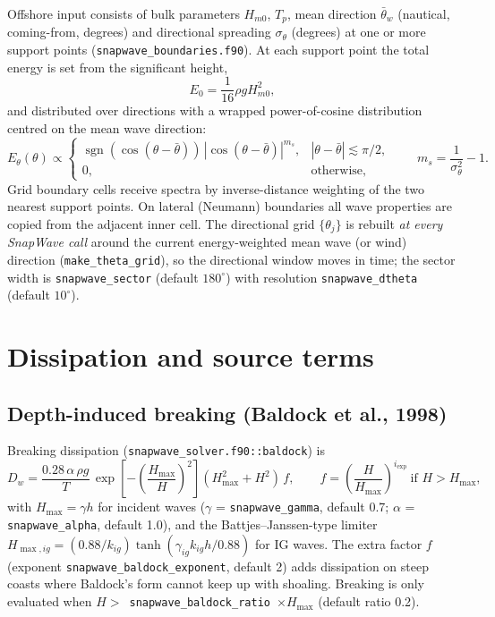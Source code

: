 \documentclass[11pt,a4paper]{article}
\newcommand{\ee}{E_\theta}
\newcommand{\code}[1]{\texttt{#1}}
\begin{document}
Offshore input consists of bulk parameters $H_{m0}$, $T_p$, mean direction
$\bar\theta_w$ (nautical, coming-from, degrees) and directional spreading
$\sigma_\theta$ (degrees) at one or more support points
(\code{snapwave\_boundaries.f90}). At each support point the total energy is set
from the significant height,
\begin{equation}
E_0=\frac{1}{16}\rho g H_{m0}^{2},
\end{equation}
and distributed over directions with a wrapped power-of-cosine distribution
centred on the mean wave direction:
\begin{equation}
\ee(\theta)\propto
\begin{cases}
\operatorname{sgn}(\cos(\theta-\bar\theta))\,
|\cos(\theta-\bar\theta)|^{m_s},
& |\theta-\bar\theta|\lesssim \pi/2,\\[2pt]
0, & \text{otherwise},
\end{cases}
\qquad m_s=\frac{1}{\sigma_\theta^{2}}-1 .
\label{eq:cosn}
\end{equation}
Grid boundary cells receive spectra by inverse-distance weighting of the two
nearest support points. On lateral (Neumann) boundaries all wave properties are
copied from the adjacent inner cell. The directional grid $\{\theta_j\}$ is
rebuilt \emph{at every SnapWave call} around the current energy-weighted mean
wave (or wind) direction (\code{make\_theta\_grid}), so the directional window
moves in time; the sector width is \code{snapwave\_sector} (default
$180^\circ$) with resolution \code{snapwave\_dtheta} (default $10^\circ$).

\section{Dissipation and source terms}
\label{sec:sources}

\subsection{Depth-induced breaking (Baldock et al., 1998)}

Breaking dissipation (\code{snapwave\_solver.f90::baldock}) is
\begin{equation}
D_w=\frac{0.28\,\alpha\,\rho g}{T}\,
\exp\!\left[-\left(\frac{H_{\max}}{H}\right)^{2}\right]
\left(H_{\max}^{2}+H^{2}\right)\,f ,
\qquad
f=\left(\frac{H}{H_{\max}}\right)^{i_{\exp}}\ \text{if } H>H_{\max},
\label{eq:baldock}
\end{equation}
with $H_{\max}=\gamma h$ for incident waves ($\gamma$ =
\code{snapwave\_gamma}, default 0.7; $\alpha$ = \code{snapwave\_alpha},
default 1.0), and the Battjes--Janssen-type limiter
$H_{\max,ig}=(0.88/k_{ig})\tanh(\gamma_{ig} k_{ig} h/0.88)$ for IG waves. The
extra factor $f$ (exponent \code{snapwave\_baldock\_exponent}, default 2) adds
dissipation on steep coasts where Baldock's form cannot keep up with shoaling.
Breaking is only evaluated when $H>$~\code{snapwave\_baldock\_ratio}~$\times
H_{\max}$ (default ratio 0.2).
\end{document}
